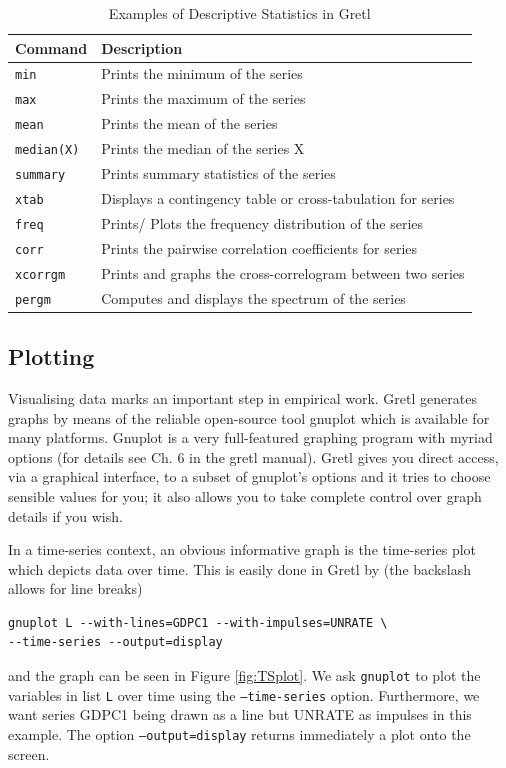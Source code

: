 \documentclass[11pt]{article}
\begin{document}
\begin{table}[!h]
	\centering
	\footnotesize
	\begin{tabular}{ll}
		\hline
		Command & Description \\ 
		\hline 
		\texttt{min} & Prints the minimum of the series \\
		\texttt{max} & Prints the maximum of the series \\
		\texttt{mean} & Prints the mean of the series \\
		\texttt{median(X)} & Prints the median of the series X \\
		\texttt{summary} & Prints summary statistics of the series \\
		\texttt{xtab} & Displays a contingency table or cross-tabulation for series\\ 
		\texttt{freq} & Prints/ Plots the frequency distribution of the series \\
		\texttt{corr} & Prints the pairwise correlation coefficients for series\\
		\texttt{xcorrgm} & Prints and graphs the cross-correlogram between two series \\
		\texttt{pergm} & Computes and displays the spectrum of the series \\
		\hline 
	\end{tabular}
	\caption{Examples of Descriptive Statistics in Gretl}
	\label{tab:descriptive}
\end{table}

\subsection{Plotting}
Visualising data marks an important step in empirical work. Gretl generates graphs by means of the reliable open-source tool gnuplot which is available for many platforms. Gnuplot is a very full-featured graphing program with myriad options (for details see Ch. 6 in the gretl manual). Gretl gives you direct access, via a graphical interface, to a subset of gnuplot’s options and it tries to choose sensible values for you; it also allows you to take complete control over graph details if you wish.

In a time-series context, an obvious informative graph is the time-series plot which depicts data over time. This is easily done in Gretl by (the backslash allows for line breaks)
\begin{Verbatim}[baselinestretch=0.75, fontsize=\small]
gnuplot L --with-lines=GDPC1 --with-impulses=UNRATE \
--time-series --output=display
\end{Verbatim}
and the graph can be seen in Figure \ref{fig:TSplot}. We ask \texttt{gnuplot} to plot the variables in list \texttt{L} over time using the \texttt{---time-series} option. Furthermore, we want series GDPC1 being drawn as a line but UNRATE as impulses in this example. The option \texttt{---output=display} returns immediately a plot onto the screen.
\end{document}
